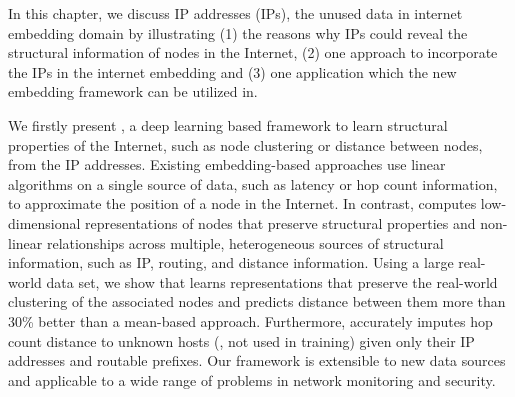 In this chapter, we discuss IP addresses (IPs), the unused data in internet embedding domain by illustrating (1) the reasons why IPs could reveal the structural information of  nodes in the Internet, (2) one approach  to incorporate the IPs in the internet embedding and (3)  one application which the new embedding framework can be utilized in. 

 We firstly present \system{}, a deep learning based framework to learn structural properties of the Internet, such as node clustering or distance between nodes, from the IP addresses.
%
Existing embedding-based approaches use linear algorithms on a single source of data, such as latency or hop count information, to approximate the position of a node in the Internet.
%
In contrast, \system{} computes low-dimensional representations of nodes that preserve structural properties and non-linear relationships across multiple, heterogeneous sources of structural information, such as IP, routing, and distance information.
%
%
Using a large real-world data set, we show that \system{} learns representations that preserve the real-world clustering of the associated nodes and predicts distance between them more than 30\% better than a mean-based approach. 
%
Furthermore, \system{} accurately imputes hop count distance to  unknown hosts (\ie{}, not used in training) given only their IP addresses and routable prefixes.
Our framework is extensible to new data sources and applicable to a wide range of problems in network monitoring and security.


